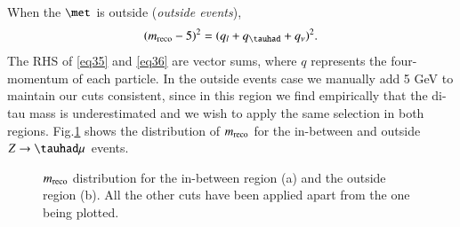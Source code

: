 When the $\met$ is outside (\textit{outside events}),
\begin{equation}
(\mreco-5)^{2}=(q_l+q_{\tauhad}+q_\nu)^2.
\label{eq36}
\end{equation}
The RHS of \eqref{eq35} and \eqref{eq36} are vector sums, where $q$ represents the four-momentum of each particle. In the outside events case we manually add 5 GeV to maintain our cuts consistent, since in this region we find empirically that the di-tau mass is underestimated and we wish to apply the same selection in both regions. Fig.\ref{Fig4} shows the distribution of $m_{\text{reco}}$ for the in-between and outside $Z\to\tauhad\mu$ events. 
\begin{figure}[htbp]
	\centering
	\hfill
	\caption{$m_{\text{reco}}$ distribution for the in-between region (a) and the outside region (b). All the other cuts have been applied apart from the one being plotted.}
	\label{Fig4}
\end{figure}

